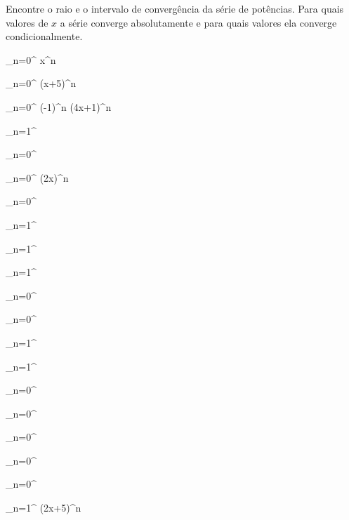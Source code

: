 \begin{exercises}
\begin{exercise}
	Encontre o raio e o intervalo de convergência da série de potências.
	Para quais valores de $x$ a série converge absolutamente e para
	quais valores ela converge condicionalmente.
	\begin{mathlist}
		\item \sum_{n=0}^{\infty} x^n                               %
		\item \sum_{n=0}^{\infty} (x+5)^n                           %
		\item \sum_{n=0}^{\infty} (-1)^n (4x+1)^n                   %
		\item \sum_{n=1}^{\infty}                 %
		\item \sum_{n=0}^{\infty}               %
		\item \sum_{n=0}^{\infty} (2x)^n                            %
		\item \sum_{n=0}^{\infty}                   %
		\item \sum_{n=1}^{\infty}           %
		\item \sum_{n=1}^{\infty}           %
		\item \sum_{n=1}^{\infty}           %
		\item \sum_{n=0}^{\infty}               %
		\item \sum_{n=0}^{\infty}                 %
		\item \sum_{n=1}^{\infty}               %
		\item \sum_{n=1}^{\infty}             %
		\item \sum_{n=0}^{\infty}           %
		\item \sum_{n=0}^{\infty}  %
		\item \sum_{n=0}^{\infty}               %
		\item \sum_{n=0}^{\infty}            %
		\item \sum_{n=0}^{\infty}            %
		\item \sum_{n=1}^{\infty} (2x+5)^n               %
	\end{mathlist}
\end{exercise}


\end{exercises}
